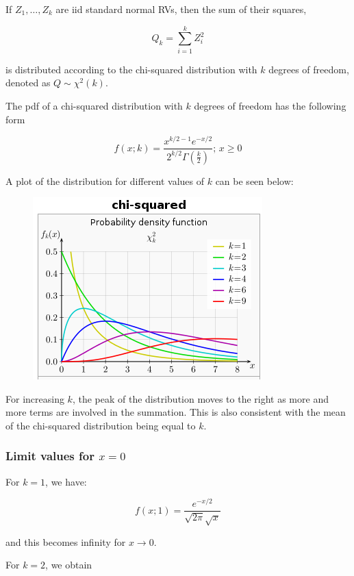 
If \(Z_1, \ldots, Z_k\) are iid standard normal RVs, then the sum of
their squares,

\[
Q_k = \sum_{i=1}^k Z_i^2
\]

is distributed according to the chi-squared distribution with \(k\)
degrees of freedom, denoted as \(Q \sim \chi^2 (k)\).

The pdf of a chi-squared distribution with \(k\) degrees of freedom has the following form

\[
f(x; k) = \frac{ x^{k/2-1} e^{-x/2} }{ 2^{k/2} \Gamma(\frac{k}{2}) }; \, x \geq 0
\]

A plot of the distribution for different values of \(k\) can be seen
below:

\begin{figure}[H]
\includegraphics{images/chi-square_01.png}
\end{figure}

For increasing \(k\), the peak of the distribution moves to the right as more and more terms are involved in the summation. This is also consistent with the mean of the chi-squared distribution being equal to \(k\).

\subsubsection{Limit values for \(x=0\)}

For \(k=1\), we have:

\begin{equation}
\label{keqone}
f(x;1) = \frac{e^{-x/2}}{\sqrt{2\pi}\sqrt{x}}
\end{equation}

and this becomes infinity for \(x \rightarrow 0\).

For \(k=2\), we obtain


